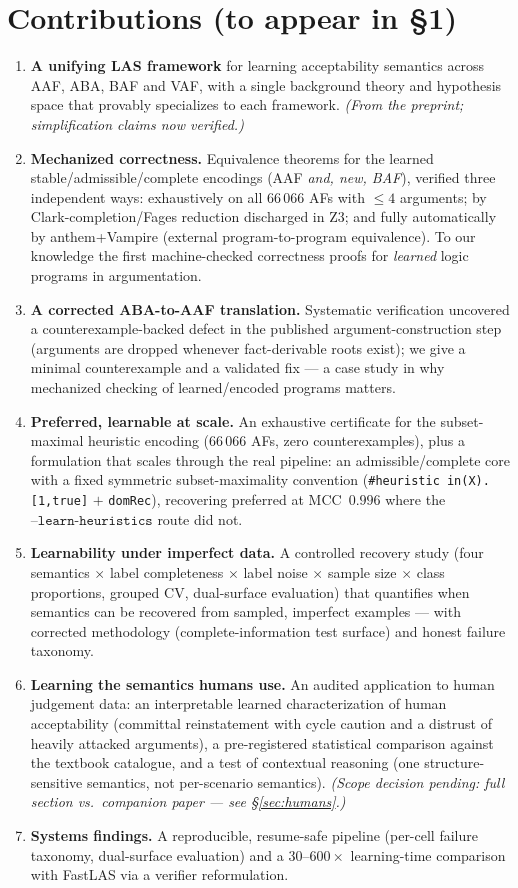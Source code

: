 \documentclass[preprint,12pt]{elsarticle}
\begin{document}
\section*{Contributions (to appear in \S1)}
\begin{enumerate}[label=\textbf{C\arabic*.},leftmargin=2.5em]
\item \textbf{A unifying LAS framework} for learning acceptability semantics
across AAF, ABA, BAF and VAF, with a single background theory and hypothesis
space that provably specializes to each framework. \emph{(From the preprint;
simplification claims now verified.)}
\item \textbf{Mechanized correctness.} Equivalence theorems for the learned
stable/admissible/complete encodings (AAF \emph{and, new, BAF}), verified three
independent ways: exhaustively on all $66\,066$ AFs with ${\le}4$ arguments;
by Clark-completion/Fages reduction discharged in Z3; and fully automatically by
anthem+Vampire (external program-to-program equivalence). To our knowledge the
first machine-checked correctness proofs for \emph{learned} logic programs in
argumentation.
\item \textbf{A corrected ABA-to-AAF translation.} Systematic verification
uncovered a counterexample-backed defect in the published argument-construction
step (arguments are dropped whenever fact-derivable roots exist); we give a
minimal counterexample and a validated fix --- a case study in why mechanized
checking of learned/encoded programs matters.
\item \textbf{Preferred, learnable at scale.} An exhaustive certificate for the
subset-maximal heuristic encoding ($66\,066$ AFs, zero counterexamples), plus a
formulation that scales through the real pipeline: an admissible/complete core
with a fixed symmetric subset-maximality convention (\texttt{\#heuristic in(X).
[1,true]} $+$ \texttt{domRec}), recovering preferred at MCC~$0.996$ where the
$\texttt{--learn-heuristics}$ route did not.
\item \textbf{Learnability under imperfect data.} A controlled recovery study
(four semantics $\times$ label completeness $\times$ label noise $\times$ sample
size $\times$ class proportions, grouped CV, dual-surface evaluation) that
quantifies when semantics can be recovered from sampled, imperfect examples ---
with corrected methodology (complete-information test surface) and honest failure
taxonomy.
\item \textbf{Learning the semantics humans use.} An audited application to human
judgement data: an interpretable learned characterization of human acceptability
(committal reinstatement with cycle caution and a distrust of heavily attacked
arguments), a pre-registered statistical comparison against the textbook
catalogue, and a test of contextual reasoning (one structure-sensitive semantics,
not per-scenario semantics). \emph{(Scope decision pending: full section vs.\
companion paper --- see \S\ref{sec:humans}.)}
\item \textbf{Systems findings.} A reproducible, resume-safe pipeline (per-cell
failure taxonomy, dual-surface evaluation) and a $30$--$600\times$ learning-time
comparison with FastLAS via a verifier reformulation.
\end{enumerate}
\end{document}
